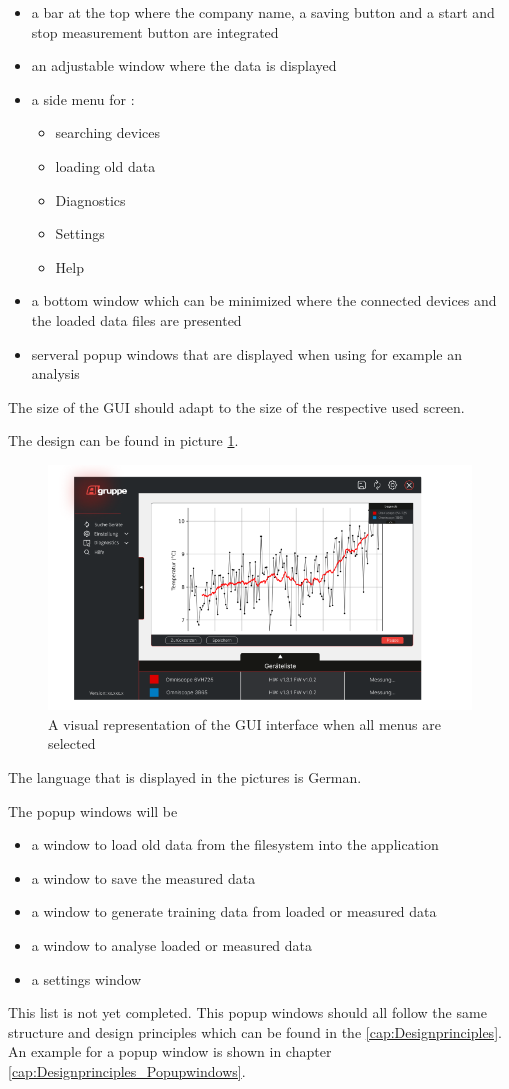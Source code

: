 \documentclass[]{scrreprt}
\begin{document}
\begin{itemize}
    \item a bar at the top where the company name, a saving button and a start and stop measurement button are integrated 
    \item an adjustable window where the data is displayed
    \item a side menu for : 
    \begin{itemize}
        \item searching devices 
        \item loading old data 
        \item Diagnostics
        \item Settings
        \item Help
    \end{itemize}
    \item a bottom window which can be minimized where the connected devices and the loaded data files are presented 
    \item serveral popup windows that are displayed when using for example an analysis
\end{itemize}

The size of the GUI should adapt to the size of the respective used screen.

The design can be found in picture \ref{fig:GUI}. 
\begin{figure}[!h]
    \includegraphics[width=.9\textwidth]{./assets/pictures/DatawindowVersion1.0.png}
    \caption[]{A visual representation of the GUI interface when all menus are selected}
    \label{fig:GUI}
\end{figure}
The language that is displayed in the pictures is German.  


The popup windows will be 
\begin{itemize}
    \item a window to load old data from the filesystem into the application
    \item a window to save the measured data 
    \item a window to generate training data from loaded or measured data
    \item a window to analyse loaded or measured data 
    \item a settings window 
\end{itemize}
This list is not yet completed. 
This popup windows should all follow the same structure and design principles which can be found in the \ref{cap:Designprinciples}. 
An example for a popup window is shown in chapter \ref{cap:Designprinciples_Popupwindows}.
\end{document}
